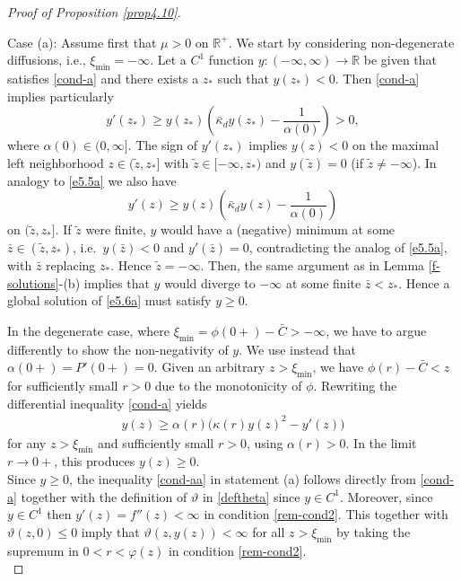 \documentclass[reqno]{amsart}
\newcommand{\R}{\mathbb{R}}
\begin{document}
\begin{proof}[Proof of Proposition \ref{prop4.10}]
\

Case (a): Assume first that $\mu>0$ on $\R^+$. We start by considering non-degenerate diffusions, i.e., $\xi_\text{min}=-\infty$. Let a $C^1$ function $y:(-\infty,\infty)\to\R$ be given that satisfies \eqref{cond-a} and there exists a $z_*$ such that $y(z_*)<0$.
Then \eqref{cond-a} implies particularly
\begin{equation}\label{e5.5a}
  y'(z_*)\ge y(z_*)\left(\bar\kappa_d y(z_*)-\frac1{\alpha(0)}\right)>0,
\end{equation}
where $\alpha(0)\in(0,\infty]$. The sign of $y'(z_*)$ implies $y(z)<0$ on the maximal left neighborhood $z\in(\tilde z,z_*]$ with $\tilde z\in[-\infty,z_*)$ and $y(\tilde z)=0$ (if $\tilde z\ne-\infty$). 
In analogy to \eqref{e5.5a} we also have
\begin{equation}\label{e5.6a}
  y'(z)\ge y(z)\left(\bar\kappa_d y(z)-\frac1{\alpha(0)}\right)
\end{equation}
on $(\tilde z,z_*]$. If $\tilde z$ were finite, $y$ would have a (negative) minimum at some $\bar z\in(\tilde z,z_*)$, i.e.\ $y(\bar z)<0$ and $y'(\bar z)=0$, contradicting the analog of \eqref{e5.5a}, with $\bar z$ replacing $z_*$. Hence $\tilde z=-\infty$. 
Then, the same argument as in Lemma \ref{f-solutions}-(b) implies that $y$ would diverge to $-\infty$ at some finite $\bar z<z_*$. Hence a global solution of \eqref{e5.6a} must satisfy $y\ge0$.

In the degenerate case, where $\xi_\text{min}=\phi(0+)-\bar C>-\infty$, we have to argue differently to show the non-negativity of $y$. We use instead that $\alpha(0+)=P'(0+)=0$. Given an arbitrary $z>\xi_\text{min}$, we have $\phi(r)-\bar C<z$ for sufficiently small $r>0$ due to the monotonicity of $\phi$. Rewriting the differential inequality \eqref{cond-a} yields
  \begin{align*}
    y(z)\ge\alpha(r)\big(\kappa(r)y(z)^2-y'(z)\big)
  \end{align*}
for any $z>\xi_\text{min}$ and sufficiently small $r>0$, using $\alpha(r)>0$. In the limit $r\to0+$, this produces $y(z)\ge0$.\\

Since $y\geq 0$, the inequality \eqref{cond-aa} in statement (a) follows directly from \eqref{cond-a} together with the definition of $\vartheta$ in \eqref{deftheta} since $y\in C^1$. Moreover, since $y\in C^1$ then $y'(z)=f''(z)<\infty$ in condition \eqref{rem-cond2}. This together with $\vartheta(z,0)\le0$ imply that  $\vartheta(z,y(z))<\infty$ for all $z>\xi_{\min}$ by taking the supremum in $0<r<\varphi(z)$ in condition \eqref{rem-cond2}.\\


\end{proof}
\end{document}
